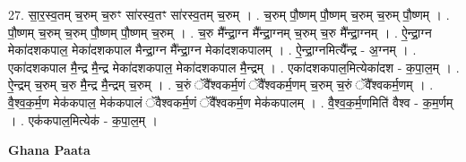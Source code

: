 \documentclass[17pt]{extarticle}
\begin{document}
27. सा॒र॒स्व॒तम् च॒रुम् च॒रुꣳ सा॑रस्व॒तꣳ सा॑रस्व॒तम् च॒रुम् । . च॒रुम् पौ॒ष्णम् पौ॒ष्णम् च॒रुम् च॒रुम् पौ॒ष्णम् । . पौ॒ष्णम् च॒रुम् च॒रुम् पौ॒ष्णम् पौ॒ष्णम् च॒रुम् । . च॒रु मै᳚न्द्रा॒ग्न मै᳚न्द्रा॒ग्नम् च॒रुम् च॒रु मै᳚न्द्रा॒ग्नम् । . ऐ॒न्द्रा॒ग्न मेका॑दशकपाल॒ मेका॑दशकपाल मैन्द्रा॒ग्न मै᳚न्द्रा॒ग्न मेका॑दशकपालम् । . ऐ॒न्द्रा॒ग्नमित्यै᳚न्द्र - अ॒ग्नम् । . एका॑दशकपाल मै॒न्द्र मै॒न्द्र मेका॑दशकपाल॒ मेका॑दशकपाल मै॒न्द्रम् । . एका॑दशकपाल॒मित्येका॑दश - क॒पा॒ल॒म् । . ऐ॒न्द्रम् च॒रुम् च॒रु मै॒न्द्र मै॒न्द्रम् च॒रुम् । . च॒रुं ॅवै᳚श्वकर्म॒णं ॅवै᳚श्वकर्म॒णम् च॒रुम् च॒रुं ॅवै᳚श्वकर्म॒णम् । . वै॒श्व॒क॒र्म॒ण मेक॑कपाल॒ मेक॑कपालं ॅवैश्वकर्म॒णं ॅवै᳚श्वकर्म॒ण मेक॑कपालम् । . वै॒श्व॒क॒र्म॒णमिति॑ वैश्व - क॒म॒र्णम् । . एक॑कपाल॒मित्येक॑ - क॒पा॒ल॒म् । \newline

\textbf{Ghana Paata } \newline
\end{document}
